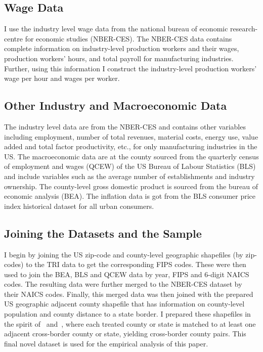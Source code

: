 \documentclass[12pt, english]{article}
\begin{document}
    \subsection{Wage Data}\label{subsec:wage-data}
    I use the industry level wage data from the national bureau of economic research-centre for economic studies (NBER-CES). The NBER-CES data contains complete information on industry-level production workers and their wages, production workers' hours, and total payroll for manufacturing industries. Further, using this information I construct the industry-level production workers' wage per hour and wages per worker.

    \subsection{Other Industry and Macroeconomic Data}\label{subsec:other-industry-and-macroeconomic-data}
    The industry level data are from the NBER-CES and contains other variables including employment, number of total revenues, material costs, energy use, value added and total factor productivity, etc., for only manufacturing industries in the US. The macroeconomic data are at the county sourced from the quarterly census of employment and wages (QCEW) of the US Bureau of Labour Statistics (BLS) and include variables such as the average number of establishments and industry ownership. The county-level gross domestic product is sourced from the bureau of economic analysis (BEA). The inflation data is got from the BLS consumer price index historical dataset for all urban consumers.

    \subsection{Joining the Datasets and the Sample}\label{subsec:joining-the-datasets-and-the-sample}
    I begin by joining the US zip-code and county-level geographic shapefiles (by zip-codes) to the TRI data to get the corresponding FIPS codes. These were then used to join the BEA, BLS and QCEW data by year, FIPS and $6$-digit NAICS codes. The resulting data were further merged to the NBER-CES dataset by their NAICS codes. Finally, this merged data was then joined with the prepared US geographic adjacent county shapefile that has information on county-level population and county distance to a state border. I prepared these shapefiles in the spirit of~\cite{dube2010minimum} and~\cite{gopalan2021state}, where each treated county or state is matched to at least one adjacent cross-border county or state, yielding cross-border county pairs. This final novel dataset is used for the empirical analysis of this paper.
\end{document}
